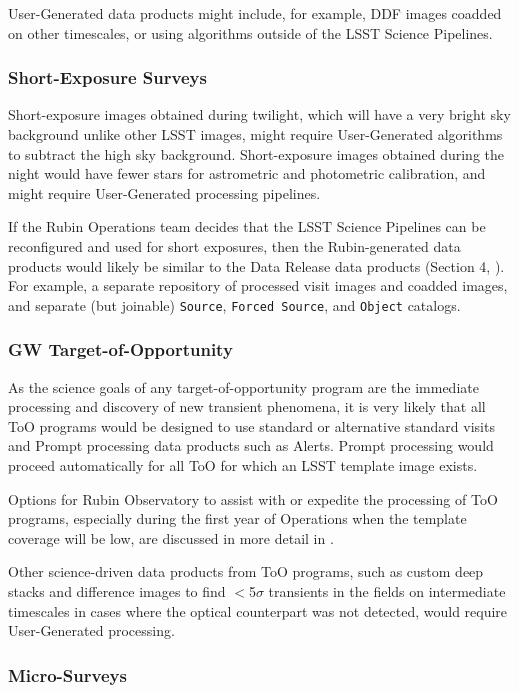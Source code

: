\documentclass[DM,lsstdoc,toc]{lsstdoc}
\begin{document}
User-Generated data products might include, for example, DDF images coadded on other timescales, or using algorithms outside of the LSST Science Pipelines.

\subsubsection{Short-Exposure Surveys}

Short-exposure images obtained during twilight, which will have a very bright sky background unlike other LSST images, might require User-Generated algorithms to subtract the high sky background. 
Short-exposure images obtained during the night would have fewer stars for astrometric and photometric calibration, and might require User-Generated processing pipelines.

If the Rubin Operations team decides that the LSST Science Pipelines can be reconfigured and used for short exposures, then the Rubin-generated data products would likely be similar to the Data Release data products (Section 4, ).
For example, a separate repository of processed visit images and coadded images, and separate (but joinable) {\tt Source}, {\tt Forced Source}, and {\tt Object} catalogs.

\subsubsection{GW Target-of-Opportunity}

As the science goals of any target-of-opportunity program are the immediate processing and discovery of new transient phenomena, it is very likely that all ToO programs would be designed to use standard or alternative standard visits and Prompt processing data products such as Alerts.
Prompt processing would proceed automatically for all ToO for which an LSST template image exists.

Options for Rubin Observatory to assist with or expedite the processing of ToO programs, especially during the first year of Operations when the template coverage will be low, are discussed in more detail in .

Other science-driven data products from ToO programs, such as custom deep stacks and difference images to find $<$5$\sigma$ transients in the fields on intermediate timescales in cases where the optical counterpart was not detected, would require User-Generated processing.

\subsubsection{Micro-Surveys}
\end{document}
